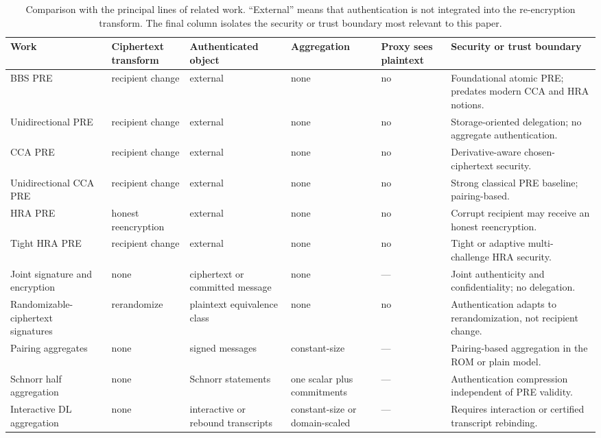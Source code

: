 \documentclass[11pt,letterpaper]{article}
\theoremstyle{definition}
\theoremstyle{remark}
\begin{document}
\begin{table}[t]
\centering
\caption{Comparison with the principal lines of related work.  ``External''
means that authentication is not integrated into the re-encryption transform.
The final column isolates the security or trust boundary most relevant to this
paper.}
\label{tab:position}
\scriptsize
\setlength{\tabcolsep}{2.7pt}
\renewcommand{\arraystretch}{1.12}
\begin{tabularx}{\textwidth}{p{}p{}p{}p{}p{}Y}
\toprule
Work & Ciphertext transform & Authenticated object & Aggregation & Proxy sees plaintext & Security or trust boundary \\
\midrule
BBS PRE~\cite{BBS98} & recipient change & external & none & no & Foundational atomic PRE; predates modern CCA and HRA notions. \\
Unidirectional PRE~\cite{AFGH06} & recipient change & external & none & no & Storage-oriented delegation; no aggregate authentication. \\
CCA PRE~\cite{CH07} & recipient change & external & none & no & Derivative-aware chosen-ciphertext security. \\
Unidirectional CCA PRE~\cite{LV08} & recipient change & external & none & no & Strong classical PRE baseline; pairing-based. \\
HRA PRE~\cite{Cohen19} & honest reencryption & external & none & no & Corrupt recipient may receive an honest reencryption. \\
Tight HRA PRE~\cite{CohenEtAl25,LingEtAl25} & recipient change & external & none & no & Tight or adaptive multi-challenge HRA security. \\
Joint signature and encryption~\cite{ADR02,FPS20} & none & ciphertext or committed message & none & --- & Joint authenticity and confidentiality; no delegation. \\
Randomizable-ciphertext signatures~\cite{BF20} & rerandomize & plaintext equivalence class & none & no & Authentication adapts to rerandomization, not recipient change. \\
Pairing aggregates~\cite{BGLS03,HWW25} & none & signed messages & constant-size & --- & Pairing-based aggregation in the ROM or plain model. \\
Schnorr half aggregation~\cite{CGKN21,CZ22} & none & Schnorr statements & one scalar plus commitments & --- & Authentication compression independent of PRE validity. \\
Interactive DL aggregation~\cite{NRS26,ZWL26} & none & interactive or rebound transcripts & constant-size or domain-scaled & --- & Requires interaction or certified transcript rebinding. \\

\end{tabularx}
\end{table}
\end{document}
